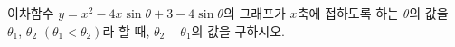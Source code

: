 이차함수 $y=x^{2}-4x\sin\theta+3-4\sin\theta$의 그래프가 $x$축에 접하도록 하는 $\theta$의 값을 $\theta_1$, $\theta_2$ $(\theta_1<\theta_2)$라 할 때, $\theta_2-\theta_1$의 값을 구하시오. 
